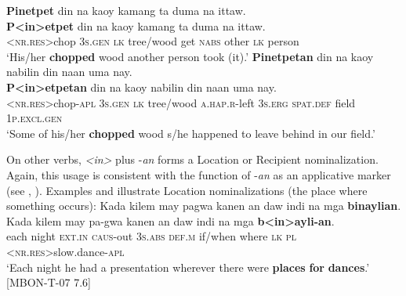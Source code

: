 \ea
\label{bkm:Ref419300396}
\textbf{Pinetpet}  din  na  kaoy  kamang  ta  duma  na  ittaw. \\\smallskip
 \gll \textbf{P<in>etpet}  din  na  kaoy  kamang  ta  duma  na  ittaw. \\
<\textsc{nr.res}>chop  3\textsc{s.gen}  \textsc{lk}  tree/wood  get  \textsc{nabs}  other  \textsc{lk}  person \\
\glt ‘His/her \textbf{chopped} wood another person took (it).’
\z
\ea
\label{bkm:Ref447637695}
\textbf{Pinetpetan}  din  na  kaoy  nabilin  din  naan  uma  nay. \\\smallskip
 \gll \textbf{P<in>etpetan}  din  na  kaoy  nabilin  din  naan\footnotemark{}  uma  nay. \\
<\textsc{nr.res}>chop-\textsc{apl}  3\textsc{s.gen}  \textsc{lk}  tree/wood  \textsc{a.hap.r}-left  3\textsc{s.erg} \textsc{spat.def}  field 1\textsc{p.excl.gen} \\
\glt ‘Some of his/her \textbf{chopped} wood s/he happened to leave behind in our field.’
\z

On other verbs, \textit{<in>} plus -\textit{an} forms a Location or Recipient nominalization. Again, this usage is consistent with the function of -\textit{an} as an applicative marker (see , ). Examples  and  illustrate Location nominalizations (the place where something occurs):
\ea
\label{bkm:Ref419300326}
Kada  kilem  may pagwa  kanen  an  daw indi  na  mga  \textbf{binaylian}. \\\smallskip
 \gll Kada  kilem  may pa-gwa\footnotemark{}  kanen  an  daw indi  na  mga  \textbf{b<in>ayli-an}. \\
each  night  \textsc{ext.in}  \textsc{caus}-out  3\textsc{s.abs}  \textsc{def.m}  if/when where  \textsc{lk}  \textsc{pl} <\textsc{nr.res}>slow.dance-\textsc{apl} \\
\glt `Each night he had a presentation wherever there were \textbf{places} \textbf{for} \textbf{dances}.’ [MBON-T-07 7.6] 
\z

